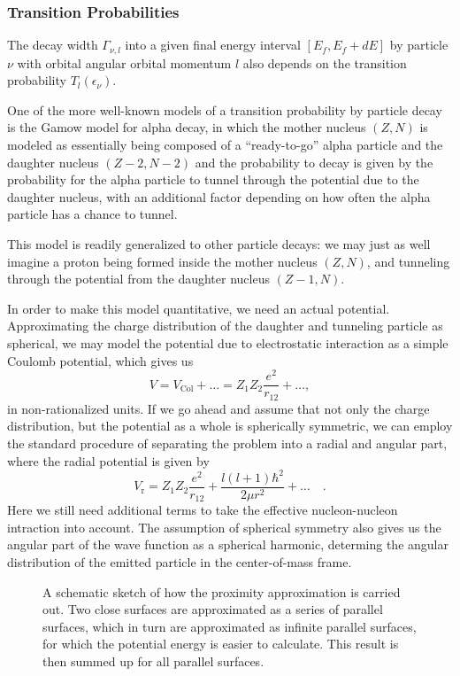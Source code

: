 \clearpage
\subsubsection{Transition Probabilities}
The decay width $\Gamma_{\nu,l}$ into a given final energy interval $[E_f,E_f+dE]$ by particle $\nu$ with orbital angular orbital momentum $l$ also depends on the transition probability $T_l(\epsilon_\nu)$.

One of the more well-known models of a transition probability by particle decay is the Gamow model for alpha decay, in which the mother nucleus $(Z,N)$ is modeled as essentially being composed of a ``ready-to-go'' alpha particle and the daughter nucleus $(Z-2,N-2)$ and the probability to decay is given by the probability for the alpha particle to tunnel through the potential due to the daughter nucleus, with an additional factor depending on how often the alpha particle has a chance to tunnel. 

This model is readily generalized to other particle decays: we may just as well imagine a proton being formed inside the mother nucleus $(Z,N)$, and tunneling through the potential from the daughter nucleus $(Z-1,N)$.

In order to make this model quantitative, we need an actual potential. Approximating the charge distribution of the daughter and tunneling particle as spherical, we may model the potential due to electrostatic interaction as a simple Coulomb potential, which gives us
\begin{equation}
V = V_\text{Col} + \dots =  Z_1 Z_2 \frac{e^2}{r_{12}} + \dots,
\end{equation}
in non-rationalized units.
If we go ahead and assume that not only the charge distribution, but the potential as a whole is spherically symmetric, we can employ the standard procedure of separating the problem into a radial and angular part, where the radial potential is given by
\begin{equation}
V_\text{r} = Z_1 Z_2 \frac{e^2}{r_{12}} + \frac{l(l+1)\hbar^2}{2\mu r^2} + \dots\quad .
\end{equation}
Here we still need additional terms to take the effective nucleon-nucleon intraction into account. The assumption of spherical symmetry also gives us the angular part of the wave function as a spherical harmonic, determing the angular distribution of the emitted particle in the center-of-mass frame.

\begin{figure}
\begin{center}

\caption{\label{fig:prox} A schematic sketch of how the proximity approximation is carried out. Two close surfaces are approximated as a series of parallel surfaces, which in turn are approximated as infinite parallel surfaces, for which the potential energy is easier to calculate. This result is then summed up for all parallel surfaces.}
\end{center}
\end{figure}

